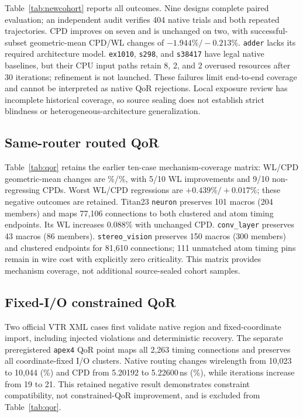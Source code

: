 \documentclass[sigconf,anonymous,review]{acmart}
\newcommand{\vpr}{\textsc{VPR}}
\begin{document}
Table~\ref{tab:newcohort} reports all outcomes. Nine designs complete paired
evaluation; an independent audit verifies 404 native trials and both repeated
trajectories. CPD improves on seven and is unchanged on two, with successful-subset
geometric-mean CPD/WL changes of $-1.944\%/-0.213\%$.
\texttt{adder} lacks its required architecture model.
\texttt{ex1010}, \texttt{s298}, and \texttt{s38417} have legal native
baselines, but their CPU input paths retain 8, 2, and 2 overused resources
after 30 iterations; refinement is not launched. These failures limit
end-to-end coverage and cannot be interpreted as native QoR rejections.
Local exposure review has incomplete historical coverage, so source sealing
does not establish strict blindness or heterogeneous-architecture generalization.

\subsection{Same-router routed QoR}

\begin{table}[t]
\centering
\small
\caption{Paired native \vpr{} routed QoR. CPD is in ns; $\dagger$ denotes the
previously probed macro-stress cohort.  All other non-development cases are
post-freeze validation.}
\label{tab:qor}

\end{table}

Table~\ref{tab:qor} retains the earlier ten-case mechanism-coverage matrix:
WL/CPD geometric-mean changes are \QorWlGeo\%/\QorCpdGeo\%, with
5/10 WL improvements and 9/10 non-regressing CPDs. Worst WL/CPD regressions
are $+0.439\%/+0.017\%$; these negative outcomes are retained.
Titan23 \texttt{neuron} preserves 101 macros (204 members) and maps 77,106
connections to both clustered and atom timing endpoints. Its WL increases
$0.088\%$ with unchanged CPD. \texttt{conv\_layer} preserves 43 macros
(86 members). \texttt{stereo\_vision} preserves 150 macros (300 members)
and clustered endpoints for 81,610 connections; 111 unmatched atom timing
pins remain in wire cost with explicitly zero criticality. This matrix
provides mechanism coverage, not additional source-sealed cohort samples.

\subsection{Fixed-I/O constrained QoR}

Two official VTR XML cases first validate native region and fixed-coordinate
import, including injected violations and deterministic recovery.  The
separate preregistered \texttt{apex4} QoR point maps all 2,263 timing
connections and preserves all \FixedIoClusters{} coordinate-fixed I/O
clusters.  Native routing changes wirelength from 10,023 to 10,044
(\ConstrainedWl\%) and CPD from 5.20192 to 5.22600\,ns
(\ConstrainedCpd\%), while iterations increase from 19 to 21.  This retained
negative result demonstrates constraint compatibility, not constrained-QoR
improvement, and is excluded from Table~\ref{tab:qor}.
\end{document}
